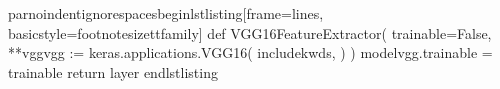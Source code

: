 \markdownRendererDocumentBegin
\markdownRendererBackslash{}par\markdownRendererBackslash{}noindent\markdownRendererBackslash{}ignorespaces\markdownRendererBackslash{}begin\markdownRendererLeftBrace{}lstlisting\markdownRendererRightBrace{}[frame=lines, basicstyle=\markdownRendererBackslash{}footnotesize\markdownRendererBackslash{}ttfamily]\markdownRendererInterblockSeparator
{}\markdownRendererSectionBegin
{}\markdownRendererInterblockSeparator
{}
\markdownRendererSectionEnd \markdownRendererSectionBegin
{}\markdownRendererInterblockSeparator
{}def VGG16FeatureExtractor( trainable=False, **vggvgg := keras.applications.VGG16( includekwds, ) ) model\markdownRendererUnderscore{}vgg.trainable = trainable return layer \markdownRendererBackslash{}end\markdownRendererLeftBrace{}lstlisting\markdownRendererRightBrace{}
\markdownRendererSectionEnd \markdownRendererDocumentEnd